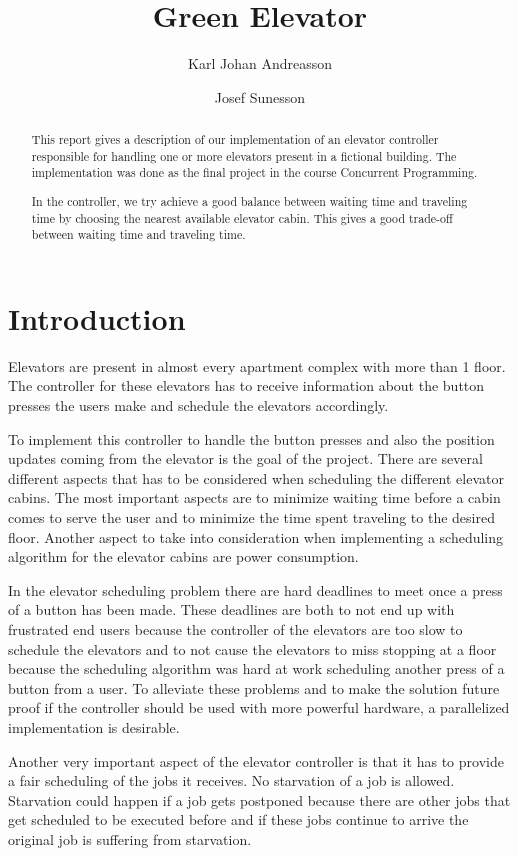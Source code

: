 \documentclass[10pt,a4paper]{article}
\author{Karl Johan Andreasson \and Josef Sunesson}
\title{Green Elevator}
\begin{document}
\maketitle

\begin{abstract}
This report gives a description of our implementation of an elevator controller responsible for handling one or more elevators present in a fictional building. The implementation was done as the final project in the course Concurrent Programming.

In the controller, we try achieve a good balance between waiting time and traveling time by choosing the nearest available elevator cabin. This gives a good trade-off between waiting time and traveling time.
\end{abstract}

\section{Introduction}
\label{sec:intro}
Elevators are present in almost every apartment complex with more than 1 floor. The controller for these elevators has to receive information about the button presses the users make and schedule the elevators accordingly.

To implement this controller to handle the button presses and also the position updates coming from the elevator is the goal of the project. There are several different aspects that has to be considered when scheduling the different elevator cabins. The most important aspects are to minimize waiting time before a cabin comes to serve the user and to minimize the time spent traveling to the desired floor. Another aspect to take into consideration when implementing a scheduling algorithm for the elevator cabins are power consumption.

In the elevator scheduling problem there are hard deadlines to meet once a press of a button has been made. These deadlines are both to not end up with frustrated end users because the controller of the elevators are too slow to schedule the elevators and to not cause the elevators to miss stopping at a floor because the scheduling algorithm was hard at work scheduling another press of a button from a user. To alleviate these problems and to make the solution future proof if the controller should be used with more powerful hardware, a parallelized implementation is desirable.

Another very important aspect of the elevator controller is that it has to provide a fair scheduling of the jobs it receives. No starvation of a job is allowed. Starvation could happen if a job gets postponed because there are other jobs that get scheduled to be executed before and if these jobs continue to arrive the original job is suffering from starvation.
\end{document}
